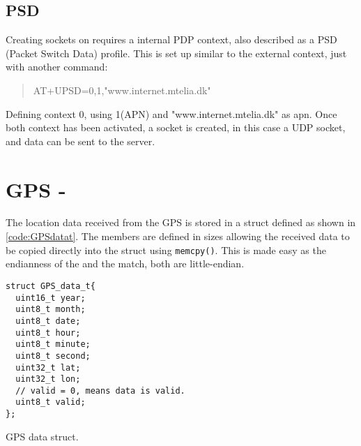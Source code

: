 \subsection{PSD}
Creating sockets on \SARA requires a internal PDP context, also described as a PSD (Packet Switch Data) profile. This is set up similar to the external context, just with another command:
\begin{quote}
	AT+UPSD=0,1,"www.internet.mtelia.dk"
\end{quote}
Defining context 0, using 1(APN) and "www.internet.mtelia.dk" as apn. Once both context has been activated, a socket is created, in this case a UDP socket, and data can be sent to the server.

\section{GPS - \GPS}
\label{sec:impl:gps}
The location data received from the \GPS GPS is stored in a struct defined as shown in \cref{code:GPSdatat}.
The members are defined in sizes allowing the received data to be copied directly into the struct using \texttt{memcpy()}.
This is made easy as the endianness of the \GPS and the \SAMD match, both are little-endian.

\begin{listing}
	\begin{verbatim}
struct GPS_data_t{
  uint16_t year;
  uint8_t month;
  uint8_t date;
  uint8_t hour;
  uint8_t minute;
  uint8_t second;
  uint32_t lat;
  uint32_t lon;
  // valid = 0, means data is valid.
  uint8_t valid;
};
	\end{verbatim}
	\caption{GPS data struct.}
	\label{code:GPSdatat}
\end{listing}

\FloatBarrier